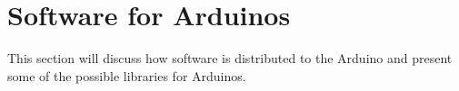 \section{Software for Arduinos}\label{sec:software}
This section will discuss how software is distributed to the Arduino and present some of the possible libraries for Arduinos.

